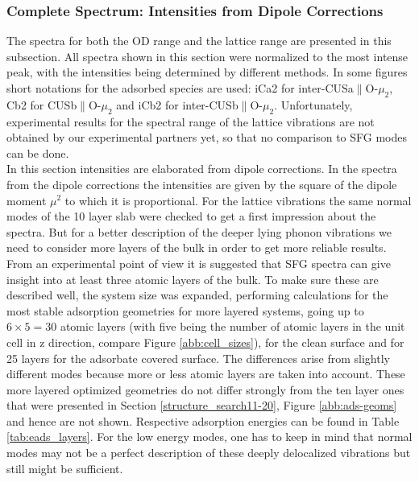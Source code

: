 \documentclass[11pt,DIV=13,BCOR=5mm,a4paper,headinclude]{scrbook}
\newcommand\todo[1]{\textcolor{red}{TODO: \textit{{#1}}}}
\begin{document}
\subsubsection{Complete Spectrum: Intensities from Dipole Corrections}\label{phonons}
The spectra for both the OD range and the lattice range are presented in this subsection.
All spectra shown in this section were normalized to the most intense peak, with the intensities being determined by different methods.
In some figures short notations for the adsorbed species are used: iCa2 for inter-CUSa$\parallel$O-$\mu_2$, Cb2 for CUSb$\parallel$O-$\mu_2$ and iCb2 for inter-CUSb$\parallel$O-$\mu_2$.
Unfortunately, experimental results for the spectral range of the lattice vibrations are not obtained by our experimental partners yet, so that no comparison to SFG modes can be done.
\\
In this section intensities are elaborated from dipole corrections.
In the spectra from the dipole corrections the intensities are given by the square of the dipole moment $\mu^2$ to which it is proportional.
For the lattice vibrations the same normal modes of the 10 layer slab were checked to get a first impression about the spectra.
But for a better description of the deeper lying phonon vibrations we need to consider more layers of the bulk in order to get more reliable results.
From an experimental point of view it is suggested that SFG spectra can give insight into at least three atomic layers of the bulk.
To make sure these are described well, the system size was expanded, performing calculations for the most stable adsorption geometries for more layered systems, going up to $6\times 5=30$ atomic layers (with five being the number of atomic layers in the unit cell in z direction, compare Figure \ref{abb:cell_sizes}), for the clean surface and for 25 layers for the adsorbate covered surface.
The differences arise from slightly different modes because more or less atomic layers are taken into account.
These more layered optimized geometries do not differ strongly from the ten layer ones that were presented in Section \ref{structure_search11-20}, Figure \ref{abb:ads-geoms} and hence are not shown.
Respective adsorption energies can be found in Table \ref{tab:eads_layers}.
For the low energy modes, one has to keep in mind that normal modes may not be a perfect description of these deeply delocalized vibrations but still might be sufficient.
\end{document}
